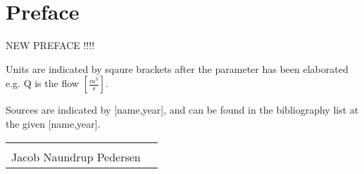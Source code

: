 \chapter*{Preface}
NEW PREFACE !!!!

Units are indicated by sqaure brackets after the parameter has been elaborated e.g. Q is the flow $\left[\frac{m^3}{s}\right]$. 

Sources are indicated by [name,year], and can be found in the bibliography list at the given
[name,year].
\vfill

\begin{table}[H]
	\centering
		\begin{tabular}{c c }
			\underline{\phantom{mmmmmmmmmmmmmmmmmmm}}       \\
			Jacob Naundrup Pedersen \\
		\end{tabular}
		
\end{table}

